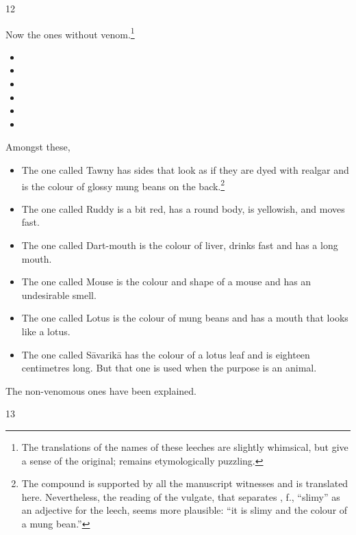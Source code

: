 \begin{translation}
\item[12]

Now the ones without venom.\footnote{The translations of the names of these 
leeches are slightly whimsical, but give a sense of the original;  
remains etymologically puzzling.} 
\begin{itemize}
    \item {}
    \item {}
    \item {}
    \item {}
    \item {}
    \item {}
\end{itemize}
Amongst these,
\begin{itemize}
    \item The one called Tawny has sides that look as if they are dyed with
realgar and is the colour of glossy mung beans on the back.\footnote{The
    compound  is supported by all the manuscript
    witnesses and is translated here.  Nevertheless, the reading of the
    vulgate, that separates , f., “slimy” as an adjective for the
    leech, seems more plausible: “it is slimy and the colour of a mung
    bean.”}
    
    \item The one called Ruddy is a bit red, has a round body, is yellowish, and 
    moves fast.
    
    \item The one called Dart-mouth is the colour of liver, drinks fast and has a long 
    mouth.
    
    \item The one called Mouse is the colour and shape of a mouse and has an 
    undesirable smell.
    
    \item The one called Lotus is the colour of mung beans and has a mouth that looks 
    like a lotus.
    
    \item The one called Sāvarikā has the colour of a lotus leaf and is eighteen 
    centimetres long.  But that one is used when the purpose is an animal. 
\end{itemize}
The non-venomous ones have been explained.

\item [13]


\end{translation}
